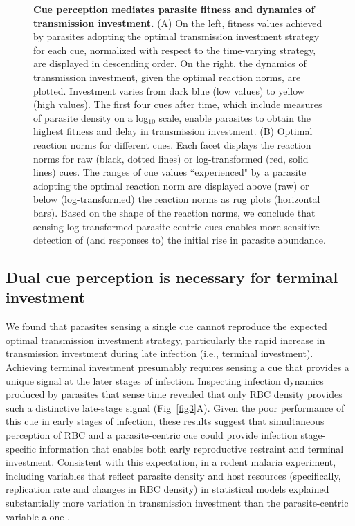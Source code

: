 \documentclass[10pt,letterpaper]{article}
\begin{document}
\begin{figure}[!h]
\caption{{\bf Cue perception mediates parasite fitness and dynamics of transmission investment.}
(A) On the left, fitness values achieved by parasites adopting the optimal transmission investment strategy for each cue, normalized with respect to the time-varying strategy, are displayed in descending order. On the right, the dynamics of transmission investment, given the optimal reaction norms, are plotted. Investment varies from dark blue (low values) to yellow (high values). The first four cues after time, which include measures of parasite density on a log$_{10}$ scale, enable parasites to obtain the highest fitness and delay in transmission investment. (B) Optimal reaction norms for different cues. Each facet displays the reaction norms for raw (black, dotted lines) or log-transformed (red, solid lines) cues. The ranges of cue values ``experienced" by a parasite adopting the optimal reaction norm are displayed above (raw) or below (log-transformed) the reaction norms as rug plots (horizontal bars). Based on the shape of the reaction norms, we conclude that sensing log-transformed parasite-centric cues enables more sensitive detection of (and responses to) the initial rise in parasite abundance.}
\label{fig2}
\end{figure}

\subsection*{Dual cue perception is necessary for terminal investment}
We found that parasites sensing a single cue cannot reproduce the expected optimal transmission investment strategy, particularly the rapid increase in transmission investment during late infection (i.e., terminal investment). Achieving terminal investment presumably requires sensing a cue that provides a unique signal at the later stages of infection. Inspecting infection dynamics produced by parasites that sense time revealed that only RBC density provides such a distinctive late-stage signal (Fig~\ref{fig3}A). Given the poor performance of this cue in early stages of infection, these results suggest that simultaneous perception of RBC and a parasite-centric cue could provide infection stage-specific information that enables both early reproductive restraint and terminal investment. Consistent with this expectation, in a rodent malaria experiment, including variables that reflect parasite density and host resources (specifically, replication rate and changes in RBC density) in statistical models explained substantially more variation in transmission investment than the parasite-centric variable alone \cite{schneider_adaptive_2018}.\newline
\end{document}
